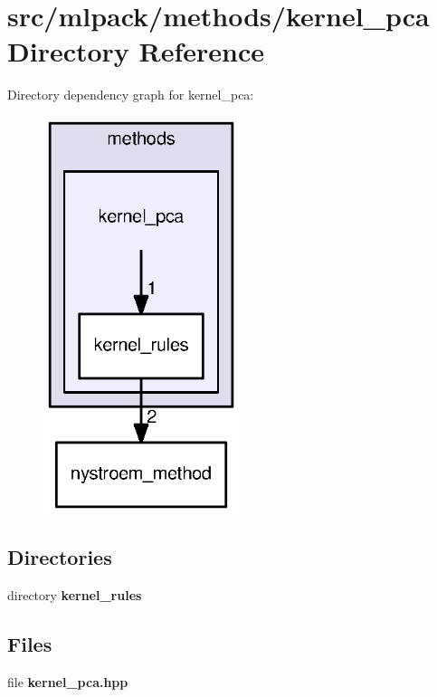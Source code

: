 \section{src/mlpack/methods/kernel\+\_\+pca Directory Reference}
\label{dir_d5ae1c28f4bc41f3d043610e8096d80a}
Directory dependency graph for kernel\+\_\+pca\+:
\nopagebreak
\begin{figure}[H]
\begin{center}
\leavevmode
\includegraphics[width=162pt]{dir_d5ae1c28f4bc41f3d043610e8096d80a_dep}
\end{center}
\end{figure}
\subsection*{Directories}
\begin{DoxyCompactItemize}
\item 
directory {\bf kernel\+\_\+rules}
\end{DoxyCompactItemize}
\subsection*{Files}
\begin{DoxyCompactItemize}
\item 
file {\bf kernel\+\_\+pca.\+hpp}
\end{DoxyCompactItemize}
